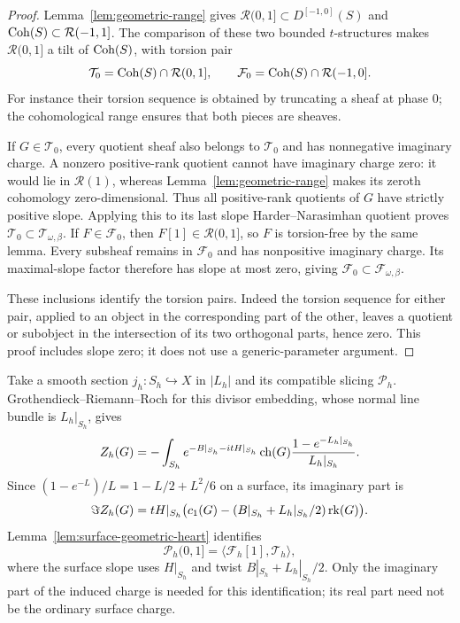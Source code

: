 \begin{proof}
Lemma~\ref{lem:geometric-range} gives
$\mathcal R(0,1]\subset D^{[-1,0]}(S)$ and
$\operatorname{Coh}(S)\subset\mathcal R(-1,1]$.  The comparison of these two bounded
$t$-structures makes $\mathcal R(0,1]$ a tilt of $\operatorname{Coh}(S)$, with torsion
pair
\[
 \mathcal T_0=\operatorname{Coh}(S)\cap\mathcal R(0,1],\qquad
 \mathcal F_0=\operatorname{Coh}(S)\cap\mathcal R(-1,0].
\]
For instance their torsion sequence is obtained by truncating a sheaf at
phase $0$; the cohomological range ensures that both pieces are sheaves.

If $G\in\mathcal T_0$, every quotient sheaf also belongs to
$\mathcal T_0$ and has nonnegative imaginary charge.  A nonzero
positive-rank quotient cannot have imaginary charge zero: it would lie in
$\mathcal R(1)$, whereas Lemma~\ref{lem:geometric-range} makes its zeroth
cohomology zero-dimensional.  Thus all positive-rank quotients of $G$ have
strictly positive slope.  Applying this to its last slope
Harder--Narasimhan quotient proves
$\mathcal T_0\subset\mathcal T_{\omega,\beta}$.
If $F\in\mathcal F_0$, then $F[1]\in\mathcal R(0,1]$, so $F$ is
torsion-free by the same lemma.  Every subsheaf remains in $\mathcal F_0$
and has nonpositive imaginary charge.  Its maximal-slope factor therefore
has slope at most zero, giving
$\mathcal F_0\subset\mathcal F_{\omega,\beta}$.

These inclusions identify the torsion pairs.  Indeed the torsion sequence
for either pair, applied to an object in the corresponding part of the
other, leaves a quotient or subobject in the intersection of its two
orthogonal parts, hence zero.  This proof includes slope zero; it does not
use a generic-parameter argument.
\end{proof}

Take a smooth section $j_h:S_h\hookrightarrow X$ in $|L_h|$ and its
compatible slicing $\mathcal P_h$.  Grothendieck--Riemann--Roch for this
divisor embedding, whose normal line bundle is $L_h|_{S_h}$, gives
\begin{equation}\label{eq:surface-induced-charge}
 Z_h(G)=-\int_{S_h}e^{-B|_{S_h}-itH|_{S_h}}\operatorname{ch}(G)
             \frac{1-e^{-L_h|_{S_h}}}{L_h|_{S_h}}.
\end{equation}
Since $(1-e^{-L})/L=1-L/2+L^2/6$ on a surface, its imaginary part is
\begin{equation}\label{eq:surface-imaginary-charge}
 \Im Z_h(G)=tH|_{S_h}\bigl(c_1(G)
             -(B|_{S_h}+L_h|_{S_h}/2)\operatorname{rk}(G)\bigr).
\end{equation}
Lemma~\ref{lem:surface-geometric-heart} identifies
\begin{equation}\label{eq:section-surface-heart}
 \mathcal P_h(0,1]=\langle\mathcal F_h[1],\mathcal T_h\rangle,
\end{equation}
where the surface slope uses $H|_{S_h}$ and twist
$B|_{S_h}+L_h|_{S_h}/2$.  Only the imaginary part of the induced charge
is needed for this identification; its real part need not be the
ordinary surface charge.

